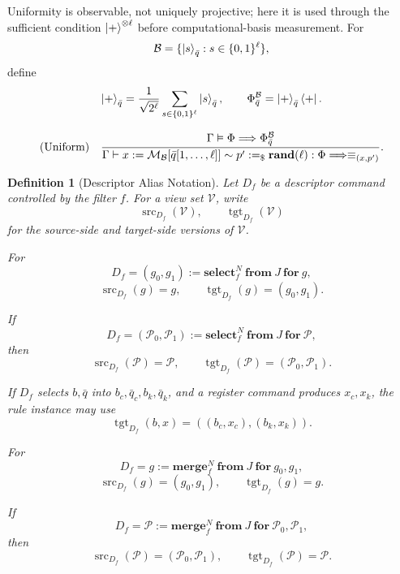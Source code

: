 \documentclass[acmsmall,screen,review,anonymous,nonacm]{acmart}
\newtheorem{definition}{Definition}[section]
\theoremstyle{defn_style}
\begin{document}
Uniformity is observable, not uniquely projective; here it is used through the
sufficient condition \(\ket{+}^{\otimes\ell}\) before computational-basis
measurement. For
\[
\mathcal B=
\{\ket{s}_{\bar q}:s\in\{0,1\}^{\ell}\},
\]
define
\[
\ket +_{\bar q}
=
\frac{1}{\sqrt{2^\ell}}
\sum_{s\in\{0,1\}^{\ell}}
\ket s_{\bar q},
\qquad
\Phi_{\bar q}^{\mathcal B}
=
\ket +_{\bar q}\bra +.
\]

\[
\text{\rm (Uniform)}
\quad
\frac{
\Gamma
\vDash
\Phi
\Longrightarrow
\Phi_{\bar q}^{\mathcal B}
}{
\Gamma
\vdash
x
:=
\mathcal M_{\mathcal B}[\bar q[1,\ldots,\ell]]
\sim
p'
:=_{\$}
\mathbf{rand}(\ell)
:
\Phi
\Longrightarrow
\equiv_{(x,p')}
}.
\]

\begin{definition}[Descriptor Alias Notation]
Let \(D_f\) be a descriptor command controlled by the filter \(f\). For a view
set \(\mathcal V\), write
\[
\operatorname{src}_{D_f}(\mathcal V),
\qquad
\operatorname{tgt}_{D_f}(\mathcal V)
\]
for the source-side and target-side versions of \(\mathcal V\).

For
\[
D_f
=
(g_0,g_1)
:=
\mathbf{select}_{f}^{N}\ \mathbf{from}~J~\mathbf{for}\ g,
\]
\[
\operatorname{src}_{D_f}(g)=g,
\qquad
\operatorname{tgt}_{D_f}(g)=(g_0,g_1).
\]

If
\[
D_f
=
(\mathcal P_0,\mathcal P_1)
:=
\mathbf{select}_{f}^{N}\ \mathbf{from}~J~\mathbf{for}\ \mathcal P,
\]
then
\[
\operatorname{src}_{D_f}(\mathcal P)=\mathcal P,
\qquad
\operatorname{tgt}_{D_f}(\mathcal P)=(\mathcal P_0,\mathcal P_1).
\]

If \(D_f\) selects \(b,\bar q\) into \(b_c,\bar q_c,b_k,\bar q_k\), and a
register command produces \(x_c,x_k\), the rule instance may use
\[
\operatorname{tgt}_{D_f}(b,x)=((b_c,x_c),(b_k,x_k)).
\]

For
\[
D_f
=
g
:=
\mathbf{merge}_{f}^{N}\ \mathbf{from}~J~\mathbf{for}\ g_0,g_1,
\]
\[
\operatorname{src}_{D_f}(g)=(g_0,g_1),
\qquad
\operatorname{tgt}_{D_f}(g)=g.
\]

If
\[
D_f
=
\mathcal P
:=
\mathbf{merge}_{f}^{N}\ \mathbf{from}~J~\mathbf{for}\ \mathcal P_0,\mathcal P_1,
\]
then
\[
\operatorname{src}_{D_f}(\mathcal P)=(\mathcal P_0,\mathcal P_1),
\qquad
\operatorname{tgt}_{D_f}(\mathcal P)=\mathcal P.
\]
\end{definition}
\end{document}
